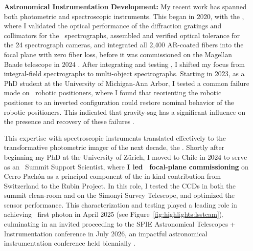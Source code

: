 \textbf{Astronomical Instrumentation Development:}
My recent work has spanned both photometric and spectroscopic instruments.
This began in 2020, with the \LLAMAS, where I validated the optical performance of the diffraction gratings and collimators for the \LLAMAS\ spectrographs, assembled and verified optical tolerance for the 24 spectrograph cameras, and integrated all 2,400 AR-coated fibers into the focal plane with zero fiber loss, before it was commissioned on the Magellan Baade telescope in 2024 \cite{Simcoe2022LLAMAS,llamas}. %
After integrating and testing \LLAMAS, I shifted my focus from integral-field spectrographs to multi-object spectrographs. Starting in 2023, as a PhD student at the University of Michigan-Ann Arbor, I tested a common failure mode on \DESI\ robotic positioners, where I found that reorienting the robotic positioner to an inverted configuration could restore nominal behavior of the robotic positioners. This indicated that gravity-sag has a significant influence on the presence and recovery of these failures \citep{Wuthrich2026Positioners}. %

This expertise with spectroscopic instruments translated effectively to the transformative photometric imager of the next decade, the \LSSTCam. Shortly after beginning my PhD at the University of Zürich, I moved to Chile in 2024 to serve as an \LSSTCam\ Summit Support Scientist, where \textbf{I led \LSSTCam\ focal-plane commissioning} on Cerro Pach\'on as a principal component of the in-kind contribution from Switzerland to the Rubin Project. In this role, I tested the CCDs in both the summit clean-room and on the Simonyi Survey Telescope, and optimized the sensor performance. This characterization and testing played a leading role in achieving \LSSTCam\ first photon in April 2025 (see Figure~\ref{fig:highlights:lsstcam}), culminating in an invited proceeding to the SPIE Astronomical Telescopes + Instrumentation conference in July 2026, an impactful astronomical instrumentation conference held biennially \citep{MacBride2026LSSTCam}. %
